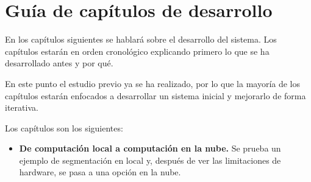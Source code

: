 \chapter{Gu\'ia de cap\'itulos de desarrollo}\label{guiacapitulos}

En los capítulos siguientes se hablará sobre el desarrollo del sistema. Los capítulos estarán en orden cronológico explicando primero lo que se ha desarrollado antes y por qué.

En este punto el estudio previo ya se ha realizado, por lo que la mayoría de los capítulos estarán enfocados a desarrollar un sistema inicial y mejorarlo de forma iterativa. 

Los capítulos son los siguientes:

\begin{itemize}
\item \textbf{De computación local a computación en la nube.} Se prueba un ejemplo de segmentación en local y, después de ver las limitaciones de hardware, se pasa a una opción en la nube.
\end{itemize}